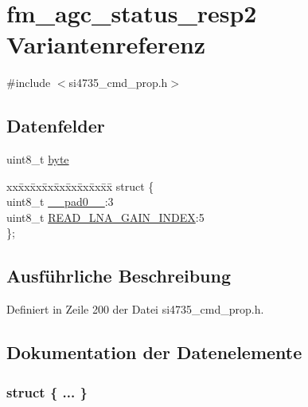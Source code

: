 \hypertarget{unionfm__agc__status__resp2}{}\section{fm\+\_\+agc\+\_\+status\+\_\+resp2 Variantenreferenz}
\label{unionfm__agc__status__resp2}


{\ttfamily \#include $<$si4735\+\_\+cmd\+\_\+prop.\+h$>$}

\subsection*{Datenfelder}
\begin{DoxyCompactItemize}
\item 
uint8\+\_\+t \hyperlink{unionfm__agc__status__resp2_a96f44d20f1dbf1c8785a7bc99a46164c}{byte}
\item 
\begin{tabbing}
xx\=xx\=xx\=xx\=xx\=xx\=xx\=xx\=xx\=\kill
struct \{\\
\>uint8\_t \hyperlink{unionfm__agc__status__resp2_a8b4eebe79ded0459acec2f4950102ba3}{\_\_pad0\_\_}:3\\
\>uint8\_t \hyperlink{unionfm__agc__status__resp2_a294c55f59e45473c7931802535ab68ed}{READ\_LNA\_GAIN\_INDEX}:5\\
\}; \\

\end{tabbing}\end{DoxyCompactItemize}


\subsection{Ausführliche Beschreibung}


Definiert in Zeile 200 der Datei si4735\+\_\+cmd\+\_\+prop.\+h.



\subsection{Dokumentation der Datenelemente}
\hypertarget{unionfm__agc__status__resp2_a8ec39963e5863ba7f7ef21c1756d863b}{}\subsubsection[{"@31}]{\setlength{\rightskip}{0pt plus 5cm}struct \{ ... \} }\label{unionfm__agc__status__resp2_a8ec39963e5863ba7f7ef21c1756d863b}
\hypertarget{unionfm__agc__status__resp2_a8b4eebe79ded0459acec2f4950102ba3}{}
